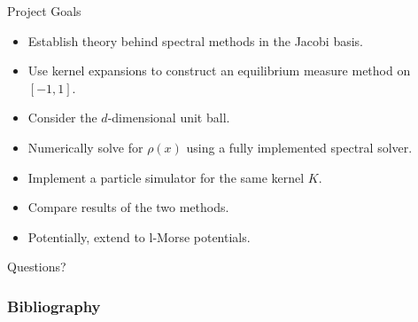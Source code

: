 \documentclass[aspectratio=169,hyperref={colorlinks=true}]{beamer}
\begin{document}
  \begin{frame}{Project Goals}
    \begin{itemize}
      \item Establish theory behind spectral methods in the Jacobi basis.
      \item Use kernel expansions to construct an equilibrium measure method on $[-1, 1]$.
      \item Consider the $d$-dimensional unit ball.
      \item Numerically solve for $\rho(x)$ using a fully implemented spectral solver.
      \item Implement a particle simulator for the same kernel $K$.
      \item Compare results of the two methods.
      \item Potentially, extend to l-Morse potentials.
    \end{itemize}
  \end{frame}

  \begin{frame}{}
    Questions?
  \end{frame}

  \begin{frame}[allowframebreaks]
    \frametitle{Bibliography}
    \nocite{*}
    \printbibliography[heading=bibnumbered]
  \end{frame}
\end{document}
